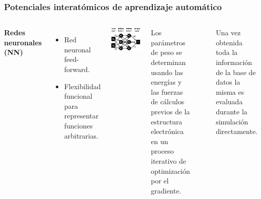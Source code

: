 \documentclass[aspectratio=169]{beamer}
\let\oldtextbf\textbf
\renewcommand{\textbf}[1]{\textcolor{nordblue}{\oldtextbf{#1}}}
\begin{document}
    \begin{frame}
        \frametitle{Potenciales interatómicos de aprendizaje automático}

        \begin{columns}
            \textbf{Redes neuronales (NN)}
            \begin{itemize}
                \item Red neuronal feed-forward.
                \item Flexibilidad funcional para representar funciones
                    arbitrarias.
            \end{itemize}

            \begin{center}
                \includegraphics[width=\columnwidth]{MLP-NN.png}
            \end{center}
        
            Los parámetros de peso se determinan usando las energías y las fuerzas
            de cálculos previos de la estructura electrónica en un proceso 
            iterativo de optimización por el gradiente.

            \

            Una vez obtenida toda la información de la base de datos la misma es
            evaluada durante la simulación directamente.

        \end{columns}

    \end{frame}
    
\end{document}
